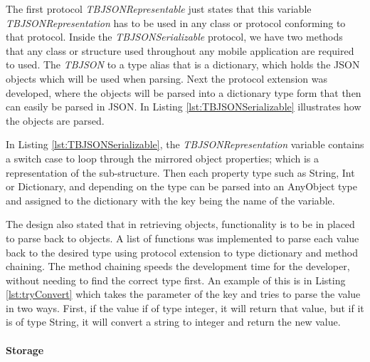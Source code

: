 

The first protocol \textit{TBJSONRepresentable} just states that this variable \textit{TBJSONRepresentation} has to be used in any class or protocol conforming to that protocol. Inside the \textit{TBJSONSerializable} protocol, we have two methods that any class or structure used throughout any mobile application are required to used. The \textit{TBJSON} to a type alias that is a dictionary, which holds the JSON objects which will be used when parsing. Next the protocol extension was developed, where the objects will be parsed into a dictionary type form that then can easily be parsed in JSON. In Listing \ref{lst:TBJSONSerializable} illustrates how the objects are parsed.



In Listing \ref{lst:TBJSONSerializable}, the \textit{TBJSONRepresentation} variable contains a switch case to loop through the mirrored object properties; which is a representation of the sub-structure. Then each property type such as String, Int or Dictionary, and depending on the type can be parsed into an AnyObject type and assigned to the dictionary with the key being the name of the variable.

The design also stated that in retrieving objects, functionality is to be in placed to parse back to objects. A list of functions was implemented to parse each value back to the desired type using protocol extension to type dictionary and method chaining. The method chaining speeds the development time for the developer, without needing to find the correct type first. An example of this is in Listing \ref{lst:tryConvert} which takes the parameter of the key and tries to parse the value in two ways. First, if the value if of type integer, it will return that value, but if it is of type String, it will convert a string to integer and return the new value.



\paragraph{Storage}

